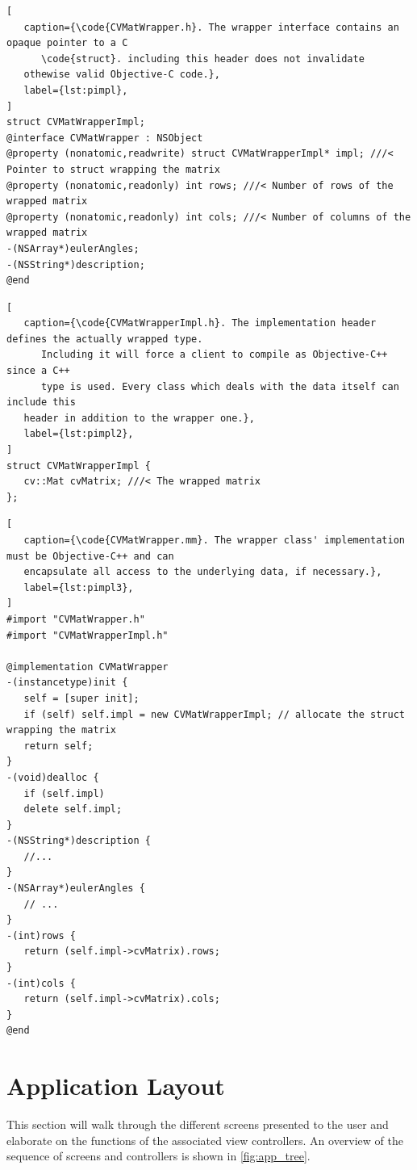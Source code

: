 \lstset{
   language=[Objective]C,
   float,
}

\begin{lstlisting}[
   caption={\code{CVMatWrapper.h}. The wrapper interface contains an opaque pointer to a C
      \code{struct}. including this header does not invalidate
   othewise valid Objective-C code.},
   label={lst:pimpl},
]
struct CVMatWrapperImpl;
@interface CVMatWrapper : NSObject
@property (nonatomic,readwrite) struct CVMatWrapperImpl* impl; ///< Pointer to struct wrapping the matrix
@property (nonatomic,readonly) int rows; ///< Number of rows of the wrapped matrix
@property (nonatomic,readonly) int cols; ///< Number of columns of the wrapped matrix
-(NSArray*)eulerAngles;
-(NSString*)description;
@end
\end{lstlisting}

\begin{lstlisting}[
   caption={\code{CVMatWrapperImpl.h}. The implementation header defines the actually wrapped type.
      Including it will force a client to compile as Objective-C++ since a C++
      type is used. Every class which deals with the data itself can include this
   header in addition to the wrapper one.},
   label={lst:pimpl2},
]
struct CVMatWrapperImpl {
   cv::Mat cvMatrix; ///< The wrapped matrix
};
\end{lstlisting}

\begin{lstlisting}[
   caption={\code{CVMatWrapper.mm}. The wrapper class' implementation must be Objective-C++ and can
   encapsulate all access to the underlying data, if necessary.},
   label={lst:pimpl3},
]
#import "CVMatWrapper.h"
#import "CVMatWrapperImpl.h"

@implementation CVMatWrapper
-(instancetype)init {
   self = [super init];
   if (self) self.impl = new CVMatWrapperImpl; // allocate the struct wrapping the matrix
   return self;
}
-(void)dealloc {
   if (self.impl)
   delete self.impl;
}
-(NSString*)description {
   //...
}
-(NSArray*)eulerAngles {
   // ...
}
-(int)rows {
   return (self.impl->cvMatrix).rows;
}
-(int)cols {
   return (self.impl->cvMatrix).cols;
}
@end
\end{lstlisting}

\section{Application Layout}

This section will walk through the different screens presented to the user and
elaborate on the functions of the associated view controllers. An overview of
the sequence of screens and controllers is shown in \autoref{fig:app_tree}.

